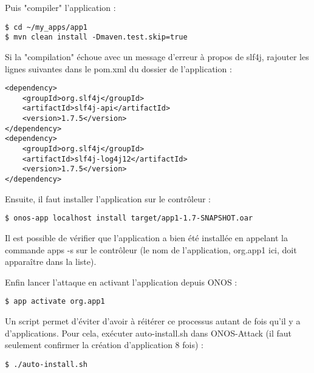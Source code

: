 Puis "compiler" l'application :
\begin{verbatim}
$ cd ~/my_apps/app1
$ mvn clean install -Dmaven.test.skip=true
\end{verbatim}

Si la "compilation" échoue avec un message d'erreur à propos de slf4j, rajouter les lignes suivantes dans le pom.xml du dossier de l'application :
\begin{verbatim}
<dependency>
    <groupId>org.slf4j</groupId>
    <artifactId>slf4j-api</artifactId>
    <version>1.7.5</version>
</dependency>
<dependency>
    <groupId>org.slf4j</groupId>
    <artifactId>slf4j-log4j12</artifactId>
    <version>1.7.5</version>
</dependency>
\end{verbatim}

Ensuite, il faut installer l'application sur le contrôleur :
\begin{verbatim}
$ onos-app localhost install target/app1-1.7-SNAPSHOT.oar
\end{verbatim}

Il est possible de vérifier que l'application a bien été installée en appelant la commande apps -s sur le contrôleur (le nom de l'application, org.app1 ici, doit apparaître dans la liste).

Enfin lancer l'attaque en activant l'application depuis ONOS :
\begin{verbatim}
$ app activate org.app1
\end{verbatim}

Un script permet d'éviter d'avoir à réitérer ce processus autant de fois qu'il y a d'applications. Pour cela, exécuter auto-install.sh dans ONOS-Attack (il faut seulement confirmer la création d'application 8 fois) :
\begin{verbatim}
$ ./auto-install.sh
\end{verbatim}